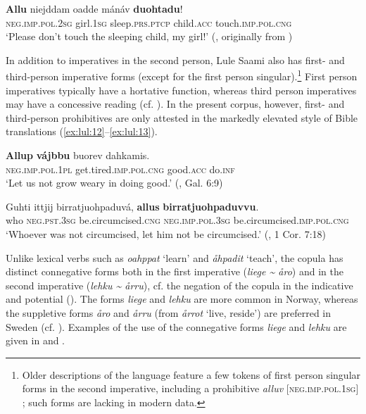 \documentclass[output=paper,colorlinks,citecolor=brown]{langscibook}
\begin{document}
\ea\label{ex:lul:11} 
    \gll \textbf{Allu} niejddam oadde mánáv \textbf{duohtadu}! \\ 
         \textsc{neg.imp.pol.2sg} girl\textsc{.1sg} sleep\textsc{.prs.ptcp} child.\textsc{acc} touch.\textsc{imp.pol.cng} \\
    \glt ‘Please don’t touch the sleeping child, my girl!’ (\citealt{SIKOR2021}, originally from \citealt[530]{Qvigstad1929})
\z 

In addition to imperatives in the second person, Lule Saami also has first- and third-person imperative forms (except for the first person singular).\footnote{Older descriptions of the language feature a few tokens of first person singular forms in the second imperative, including a prohibitive \textit{alluv} [\textsc{neg.imp.pol.1sg}] \citep[79]{Wiklund1915}; such forms are lacking in modern data.} First person imperatives typically have a hortative function, whereas third person imperatives may have a concessive reading (cf. \citealt[114]{Wiklund1915}). In the present corpus, however, first- and third-person prohibitives are only attested in the markedly elevated style of Bible translations (\ref{ex:lul:12}--\ref{ex:lul:13}).

\ea\label{ex:lul:12} 
    \gll \textbf{Allup} \textbf{vájbbu} buorev dahkamis. \\ 
         \textsc{neg}.\textsc{imp.pol.1pl} get.tired\textsc{.imp.pol.cng} good\textsc{.acc} do\textsc{.inf} \\
    \glt ‘Let us not grow weary in doing good.’ (\citealt{SIKOR2021}, Gal. 6:9)
\z 

\ea\label{ex:lul:13} 
    \gll Guhti ittjij birratjuohpaduvá, \textbf{allus} \textbf{birratjuohpaduvvu}. \\ 
         who \textsc{neg.pst.3sg} be.circumcised.\textsc{cng} \textsc{neg.imp.pol.3sg} be.circumcised.\textsc{imp.pol.cng} \\
    \glt ‘Whoever was not circumcised, let him not be circumcised.’ (\citealt{SIKOR2021}, 1 Cor. 7:18)
\z 

Unlike lexical verbs such as \textit{oahppat} ‘learn’ and \textit{åhpadit} ‘teach’, the copula has distinct connegative forms both in the first imperative (\textit{liege {\textasciitilde} åro}) and in the second imperative (\textit{lehku {\textasciitilde} årru}), cf. the negation of the copula in the indicative and potential (). The forms \textit{liege} and \textit{lehku} are more common in Norway, whereas the suppletive forms \textit{åro} and \textit{årru} (from \textit{årrot} ‘live, reside’) are preferred in Sweden (cf. \citealt[69]{Spiik1989}). Examples of the use of the connegative forms \textit{liege} and \textit{lehku} are given in  and .
\end{document}
